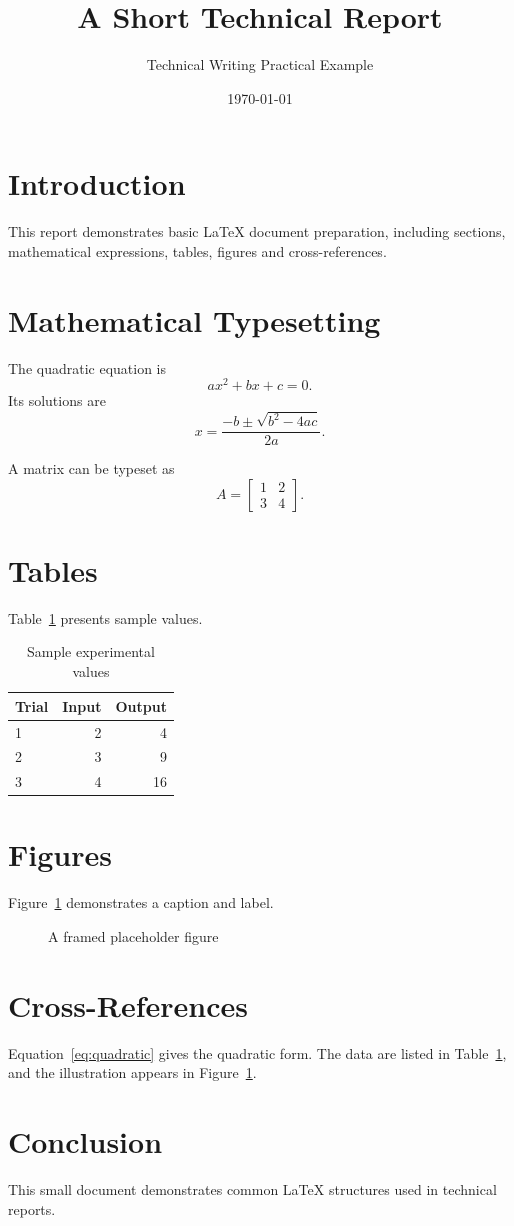 \documentclass[12pt,a4paper]{article}
\title{A Short Technical Report}
\author{Technical Writing Practical Example}
\date{\today}
\begin{document}
\maketitle
\tableofcontents
\newpage

\section{Introduction}
This report demonstrates basic LaTeX document preparation, including
sections, mathematical expressions, tables, figures and cross-references.

\section{Mathematical Typesetting}
The quadratic equation is
\begin{equation}
  ax^2 + bx + c = 0.
  \label{eq:quadratic}
\end{equation}
Its solutions are
\[
  x = \frac{-b \pm \sqrt{b^2 - 4ac}}{2a}.
\]

A matrix can be typeset as
\[
A = \begin{bmatrix}
1 & 2 \\
3 & 4
\end{bmatrix}.
\]

\section{Tables}
Table~\ref{tab:results} presents sample values.

\begin{table}[htbp]
\centering
\caption{Sample experimental values}
\label{tab:results}
\begin{tabular}{lrr}
\toprule
Trial & Input & Output \\
\midrule
1 & 2 & 4 \\
2 & 3 & 9 \\
3 & 4 & 16 \\
\bottomrule
\end{tabular}
\end{table}

\section{Figures}
Figure~\ref{fig:placeholder} demonstrates a caption and label.
\begin{figure}[htbp]
\centering
{}
\caption{A framed placeholder figure}
\label{fig:placeholder}
\end{figure}

\section{Cross-References}
Equation~\ref{eq:quadratic} gives the quadratic form.
The data are listed in Table~\ref{tab:results}, and the illustration
appears in Figure~\ref{fig:placeholder}.

\section{Conclusion}
This small document demonstrates common LaTeX structures used in
technical reports.
\end{document}
